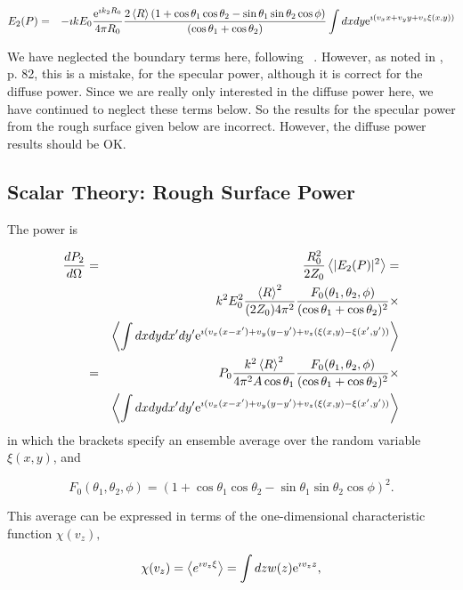 \documentclass[11pt]{article}
\newcommand{\der}[2]{\frac{d {#1}}{d {#2}}}
\newcommand{\e}{{\rm e}}
\begin{document}
{{{{\begin{eqnarray}
E_{2}(P)&=&-\imath kE_{0}\frac{\e^{\imath k_{2}R_{0}}}{4\pi R_{0}}\frac{2\left<R\right>\left(1+\cos\theta_{1}\cos\theta_{2}-\sin\theta_{1}\sin\theta_{2}\cos\phi\right)}{(\cos{\theta_{1}}+\cos{\theta_{2}})}\int dx dy\e^{\imath( v_{x}x+v_{y}y+v_{z}\xi(x,y))}
\end{eqnarray}

We have neglected the boundary terms here, following
~\cite{b:beckmann}. However, as noted in \cite{b:ogilvy}, p. 82, this is a
mistake, for the specular power, although it is correct for the
diffuse power. Since we are really only interested in the diffuse
power here, we have continued to neglect these terms below. So the
results for the specular power from the rough surface given below are
incorrect. However, the diffuse power results should be OK.

\subsection{Scalar Theory: Rough Surface Power} 

The power is

\begin{eqnarray}
\der{P_{2}}{\Omega}&=&\frac{R_{0}^{2}}{2Z_{0}}\left<|E_{2}(P)|^{2}\right>=\\
&&k^{2}E_{0}^{2}\frac{\left<R\right>^{2}}{(2Z_{0})4\pi^{2}}\frac{F_{0}(\theta_{1},\theta_{2},\phi)}{(\cos{\theta_{1}}+\cos{\theta_{2}})^{2}}\times\\
&&\left<\int dx dydx'dy'\e^{\imath( v_{x}(x-x')+v_{y}(y-y')+v_{z}(\xi(x,y)-\xi(x',y'))}\right>\\
&=&P_{0}\frac{k^{2}\left<R\right>^{2}}{4\pi^{2}A\cos\theta_{1}}\frac{F_{0}(\theta_{1},\theta_{2},\phi)}{(\cos{\theta_{1}}+\cos{\theta_{2}})^{2}}\times\\
&&\left<\int dx dydx'dy'\e^{\imath( v_{x}(x-x')+v_{y}(y-y')+v_{z}(\xi(x,y)-\xi(x',y'))}\right>\end{eqnarray}
in which the brackets specify an ensemble average over the random variable $\xi(x,y)$, and

$$F_{0}(\theta_{1},\theta_{2},\phi)=\left(1+\cos\theta_{1}\cos\theta_{2}-\sin\theta_{1}\sin\theta_{2}\cos\phi\right)^{2}.$$

This average can be expressed in terms of the one-dimensional characteristic function $\chi(v_{z}),$

$$\chi(v_{z})=\left<e^{\imath v_{z}\xi}\right>=\int dz w(z) \e^{\imath v_{z}z},$$

}}}}
\end{document}
